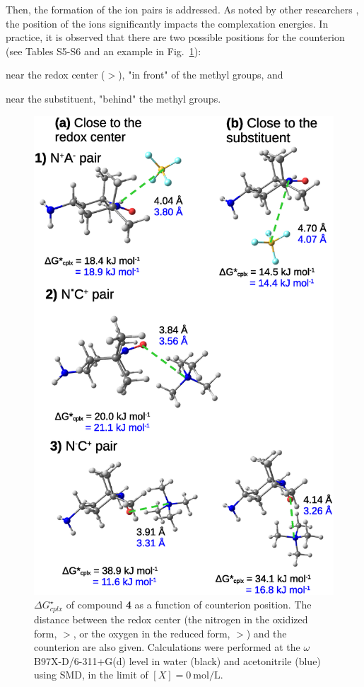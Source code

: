 \documentclass[review,preprint]{elsarticle}
\begin{document}
\clearpage

Then, the formation of the ion pairs is addressed. As noted by other researchers \cite{zhangInteractionsImidazoliumBasedIonic2016,wylieImprovedPerformanceAllOrganic2019a}, the position of the ions significantly impacts the complexation energies. In practice, it is observed that there are two possible positions for the counterion (see Tables S5-S6 and an example in Fig.~\ref{fig:pos-anion}):
\begin{inparaenum}[(i)]
	\item near the redox center ($>$), "in front" of the methyl groups, and
	\item near the substituent, "behind" the methyl groups.
\end{inparaenum}

\begin{figure}[!h]
\centering
\includegraphics[width=.8\linewidth]{Figure12}
\caption{$\Delta G^\star_{cplx}$ of compound \textbf{4} as a function of counterion position. The distance between the redox center (the nitrogen in the oxidized form, $>$, or the oxygen in the reduced form, $>$) and the counterion are also given. Calculations were performed at the $\omega$B97X-D/6-311+G(d) level in water (black) and acetonitrile (blue) using SMD, in the limit of $[X]=\SI{0}{\mole\per\liter}$.}
\label{fig:pos-anion}
\end{figure}
\end{document}
